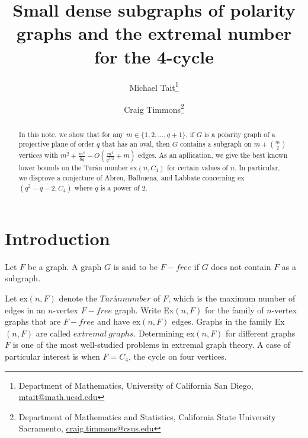 \documentclass[12pt]{article}
\date{}
\title{Small dense subgraphs of polarity graphs and the extremal number for the 4-cycle}
\author{
    Michael Tait\thanks{Department of Mathematics, University of California San Diego, \url{mtait@math.ucsd.edu}}
    \and
    Craig Timmons\thanks{Department of Mathematics and Statistics, California State University Sacramento, \mbox{\url{craig.timmons@csus.edu}}}
}
\begin{document}
\maketitle

\begin{abstract}
    In this note, we show that for any $m \in \{1,2,\ldots, q+1\}$, if $G$ is a polarity graph
    of a projective plane of order $q$ that has an oval, then $G$ contains a subgraph on
    $m + {m \choose 2}$ vertices with $m^2 + \frac{m^4}{8q} - O(\frac{m^4}{q^{3/2}}+m)$ edges. As an apllication, we give the
    best known lower bounds on the Turán number ex$(n,C_4)$ for certain values of $n$. In
    particular, we disprove a conjecture of Abreu, Balbuena, and Labbate concerning
    ex$(q^2 - q - 2, C_4)$ where $q$ is a power of 2.
\end{abstract}

\section{Introduction}

Let $F$ be a graph. A graph $G$ is said to be $F-free$ if $G$ does not contain $F$ as a subgraph.

Let ex$(n, F)$ denote the $Turán number$ of $F$, which is the maximum number of edges
in an $n$-vertex $F-free$ graph. Write Ex$(n, F )$ for the family of $n$-vertex graphs that
are $F-free$ and have ex$(n, F)$ edges. Graphs in the family Ex$(n, F)$ are called $extremal\
    graphs$. Determining ex$(n, F)$ for different graphs $F$ is one of the most well-studied
problems in extremal graph theory. A case of particular interest is when $F = C_4$,
the cycle on four vertices.
\end{document}
